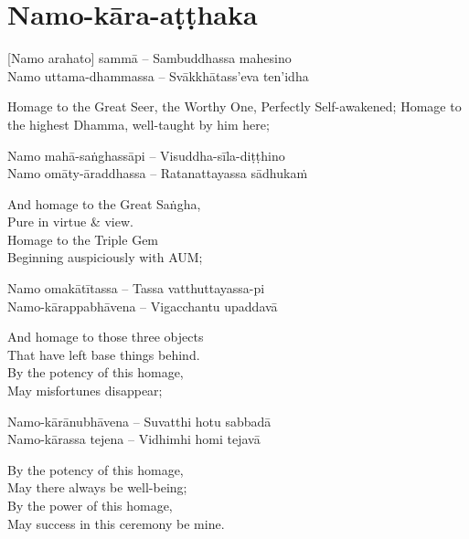 \suttaRef{[Thai]}

\section{Namo-kāra-aṭṭhaka}
\label{namo-kara-atthaka}

\vspace{-0.6em}

[Namo arahato] sammā – Sambuddhassa mahesino\\
Namo uttama-dhammassa – Svākkhātass'eva ten'idha

\begin{english-verses}
  Homage to the Great Seer, the Worthy One, Perfectly Self-awakened; Homage to the highest Dhamma, well-taught by him here;
\end{english-verses}

Namo mahā-saṅghassāpi – Visuddha-sīla-diṭṭhino\\
Namo omāty-āraddhassa – Ratanattayassa sādhukaṁ

\begin{english-verses}
  And homage to the Great Saṅgha,\\
  Pure in virtue \& view.\\
  Homage to the Triple Gem\\
  Beginning auspiciously with AUM;
\end{english-verses}

Namo omakātītassa – Tassa vatthuttayassa-pi\\
Namo-kārappabhāvena – Vigacchantu upaddavā\\

\begin{english-verses}
  And homage to those three objects\\
  That have left base things behind.\\
  By the potency of this homage,\\
  May misfortunes disappear;
\end{english-verses}

Namo-kārānubhāvena – Suvatthi hotu sabbadā\\
Namo-kārassa tejena – Vidhimhi homi tejavā

\begin{english-verses}
  By the potency of this homage,\\
  May there always be well-being;\\
  By the power of this homage,\\
  May success in this ceremony be mine.
\end{english-verses}

